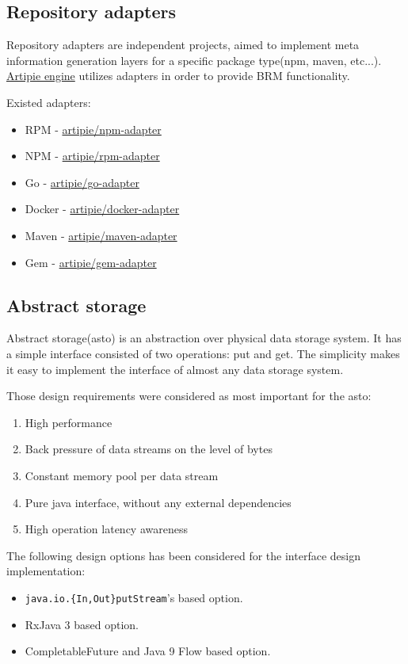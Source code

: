\documentclass[12pt,oneside]{article}
\newcommand\dd[1]{\colorbox{gray!30}{\texttt{#1}}}
\begin{document}
\subsection{Repository adapters}
Repository adapters are independent projects, 
aimed to implement meta information generation
layers for a specific package type(npm, maven, etc...).
\hyperref[sec:arti-engine]{Artipie engine} utilizes adapters in order to provide BRM functionality.

Existed adapters:
\begin{itemize}
	\item RPM - \href{https://github.com/artipie/npm-adapter}{artipie/npm-adapter}
	\item NPM - \href{https://github.com/artipie/rpm-adapter}{artipie/rpm-adapter}
	\item Go - \href{https://github.com/artipie/go-adapter}{artipie/go-adapter}
	\item Docker - \href{https://github.com/artipie/go-adapter}{artipie/docker-adapter}
	\item Maven - \href{https://github.com/artipie/go-adapter}{artipie/maven-adapter}
	\item Gem - \href{https://github.com/artipie/go-adapter}{artipie/gem-adapter}
\end{itemize}

\subsection{Abstract storage}
\label{sec:asto}
Abstract storage(asto) is an abstraction over physical data storage system.
It has a simple interface consisted of two operations: put and get.
The simplicity makes it easy to implement the interface of almost any data storage system.

Those design requirements were considered as most important for the asto: 
\begin{enumerate}
  \item High performance
  \item Back pressure of data streams on the level of bytes
	\item Constant memory pool per data stream
	\item Pure java interface, without any external dependencies
	\item High operation latency awareness
\end{enumerate}

The following design options has been considered for the interface design implementation:
\begin{itemize}
  \item \dd{java.io.\{In,Out\}putStream}'s based option. 
  \item RxJava 3 based option.
	\item CompletableFuture and Java 9 Flow based option.
\end{itemize}
\end{document}
